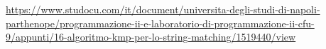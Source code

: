 \begin{thebibliography}{9}
 \url{https://www.studocu.com/it/document/universita-degli-studi-di-napoli-parthenope/programmazione-ii-e-laboratorio-di-programmazione-ii-cfu-9/appunti/16-algoritmo-kmp-per-lo-string-matching/1519440/view}
\end{thebibliography}
